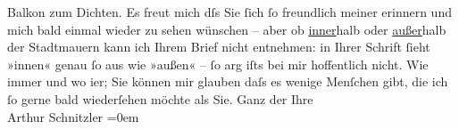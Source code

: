 \begin{ledgroupsized}[t]{13cm}
                  {\pb}Balkon zum Dichten.\pend
           \pstart
           Es freut mich dſs Sie ſich ſo freundlich meiner erinnern und mich bald einmal wieder
               zu sehen wünschen – aber ob \uline{inner}halb oder \uline{außer}halb der Stadtmauern kann ich Ihrem Brief nicht
               entnehmen: in Ihrer Schrift ſieht {\pb}»innen«
               genau ſo aus wie »außen« – ſo arg iſts bei mir hoffentlich nicht.\pend
           \pstart
           Wie immer und wo i{\geminationm}er; Sie können mir glauben daſs es
               wenige Menſchen gibt, die ich ſo gerne bald wiederſehen möchte als Sie.\pend
           \pstart
           Ganz der Ihre{\\[\baselineskip]}Arthur Schnitzler\pend
           \leftskip=0em{}
         
         \endnumbering{}\end{ledgroupsized}  \newcommand{\dateiname}{L00964}\newcommand{\titel}{Arthur Schnitzler an Gerhart Hauptmann, 25. 8. 1899}\newcommand{\editorInnen}{ Martin Anton Müller und Gerd-Hermann Susen}
      